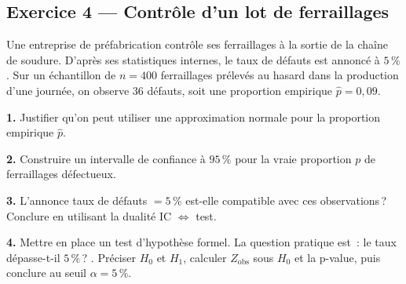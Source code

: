 \subsection*{Exercice 4 --- Contrôle d'un lot de ferraillages}

Une entreprise de préfabrication contrôle ses ferraillages à la sortie de la chaîne de soudure. D'après ses statistiques internes, le taux de défauts est annoncé à $5\,\%$. Sur un échantillon de $n = 400$ ferraillages prélevés au hasard dans la production d'une journée, on observe $36$ défauts, soit une proportion empirique $\widehat{p} = 0{,}09$.

\textbf{1.} Justifier qu'on peut utiliser une approximation normale pour la proportion empirique $\widehat{p}$.

\textbf{2.} Construire un intervalle de confiance à $95\,\%$ pour la vraie proportion $p$ de ferraillages défectueux.

\textbf{3.} L'annonce \og taux de défauts $= 5\,\%$ \fg{} est-elle compatible avec ces observations\,? Conclure en utilisant la dualité IC $\Leftrightarrow$ test.

\textbf{4.} Mettre en place un test d'hypothèse formel. La question pratique est~: \og le taux dépasse-t-il $5\,\%$\,? \fg{}. Préciser $H_0$ et $H_1$, calculer $Z_{\text{obs}}$ sous $H_0$ et la p-value, puis conclure au seuil $\alpha = 5\,\%$.

